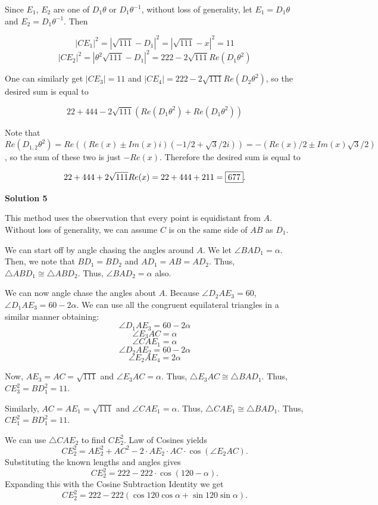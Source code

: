 \begin{enumerate}
 Since $E_1$, $E_2$ are one of $D_1\theta$ or $D_1\theta^{-1}$, without loss of generality, let $E_1=D_1\theta$ and $E_2 = D_1\theta^{-1}$. Then

 
 \[|CE_1|^2 = |\sqrt{111}-D_1|^2 = |\sqrt{111}-x|^2=11\]
 \[|CE_2|^2 = |\theta^2 \sqrt{111} - D_1|^2 = 222-2\sqrt{111} Re(D_1 \theta^2)\]

 One can similarly get $|CE_3|=11$ and $|CE_4|=222-2\sqrt{111} Re(D_2 \theta^2)$, so the desired sum is equal to

 
 \[22+444-2\sqrt{111}(Re(D_1 \theta^2)+Re(D_1 \theta^2))\]

 Note that $Re(D_{1,2} \theta^2) = Re((Re(x) \pm Im(x)i)(-1/2 + \sqrt{3}/2i)) = - (Re(x)/2 \pm Im(x)\sqrt{3}/2)$, so the sum of these two is just $-Re(x)$. Therefore the desired sum is equal to 

 
 \[22+444+2\sqrt{111}Re(x) = 22+444+211 = \framebox{677}.\]




\textbf{Solution 5}

This method uses the observation that every point is equidistant from $A$. Without loss of generality, we can assume $C$ is on the same side of $AB$ as $D_1$.

 We can start off by angle chasing the angles around $A$. We let $\angle BAD_1 = \alpha$. Then, we note that $BD_1 = BD_2$ and $AD_1 = AB = AD_2$. Thus, $\bigtriangleup ABD_1 \cong \bigtriangleup ABD_2$. Thus, $\angle BAD_2 = \alpha$ also.

 We can now angle chase the angles about $A$. Because $\angle D_2AE_3 = 60$, $\angle D_1AE_3 = 60- 2 \alpha$. We can use all the congruent equilateral triangles in a similar manner obtaining:
 \[\angle D_1AE_3 = 60- 2 \alpha\]
 \[\angle E_3AC = \alpha\]
 \[\angle CAE_1 = \alpha\]
 \[\angle D_2AE_2 = 60- 2 \alpha\]
 \[\angle E_2AE_4 = 2 \alpha\]

 Now, $AE_3 = AC = \sqrt{111}$ and $\angle E_3AC = \alpha$. Thus, $\bigtriangleup E_3AC \cong \bigtriangleup BAD_1$. Thus, $CE_3^2 = BD_1^2 = 11$.

 Similarly, $AC = AE_1 = \sqrt{111}$ and $\angle CAE_1 = \alpha$. Thus, $\bigtriangleup CAE_1 \cong \bigtriangleup BAD_1$. Thus, $CE_1^2 = BD_1^2 = 11$.

 We can use $\bigtriangleup CAE_2$ to find $CE_2^2$. Law of Cosines yields
 \[CE_2^2 = AE_2^2 + AC^2 - 2 \cdot AE_2 \cdot AC \cdot \cos(\angle E_2AC).\]Substituting the known lengths and angles gives
 \[CE_2^2 = 222 - 222 \cdot \cos(120- \alpha).\]Expanding this with the Cosine Subtraction Identity we get
 \[CE_2^2 = 222 - 222(\cos120 \cos \alpha + \sin120 \sin \alpha).\]


\end{enumerate}

